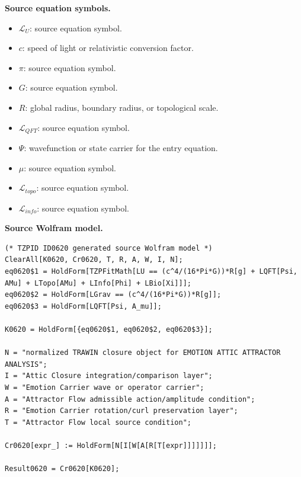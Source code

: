 \begin{minipage}[t]{0.49\linewidth}
\begingroup
\small
\raggedright
\textbf{Source equation symbols.}\par
\begin{itemize}[leftmargin=1.35em,itemsep=1pt,topsep=1pt,parsep=0pt]
    \item $\mathcal{L}_U$: source equation symbol.
    \item $c$: speed of light or relativistic conversion factor.
    \item $\pi$: source equation symbol.
    \item $G$: source equation symbol.
    \item $R$: global radius, boundary radius, or topological scale.
    \item $\mathcal{L}_{QFT}$: source equation symbol.
    \item $\Psi$: wavefunction or state carrier for the entry equation.
    \item $\mu$: source equation symbol.
    \item $\mathcal{L}_{topo}$: source equation symbol.
    \item $\mathcal{L}_{info}$: source equation symbol.
\end{itemize}
\endgroup
\end{minipage}\hfill
\begin{minipage}[t]{0.47\linewidth}
\begingroup
\scriptsize
\raggedright
\textbf{Source Wolfram model.}\par
\begin{Verbatim}[fontsize=\tiny,breaklines=true,breakanywhere=true]
(* TZPID ID0620 generated source Wolfram model *)
ClearAll[K0620, Cr0620, T, R, A, W, I, N];
eq0620$1 = HoldForm[TZPFitMath[LU == (c^4/(16*Pi*G))*R[g] + LQFT[Psi, AMu] + LTopo[AMu] + LInfo[Phi] + LBio[Xi]]];
eq0620$2 = HoldForm[LGrav == (c^4/(16*Pi*G))*R[g]];
eq0620$3 = HoldForm[LQFT[Psi, A_mu]];

K0620 = HoldForm[{eq0620$1, eq0620$2, eq0620$3}];

N = "normalized TRAWIN closure object for EMOTION ATTIC ATTRACTOR ANALYSIS";
I = "Attic Closure integration/comparison layer";
W = "Emotion Carrier wave or operator carrier";
A = "Attractor Flow admissible action/amplitude condition";
R = "Emotion Carrier rotation/curl preservation layer";
T = "Attractor Flow local source condition";

Cr0620[expr_] := HoldForm[N[I[W[A[R[T[expr]]]]]]];

Result0620 = Cr0620[K0620];
\end{Verbatim}
\endgroup
\end{minipage}


